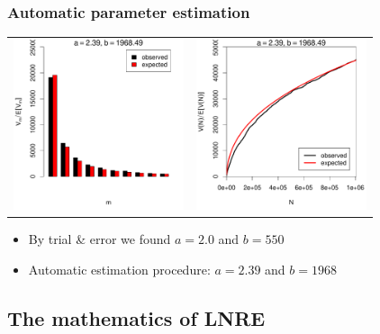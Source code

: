 \documentclass[t]{beamer} %
\begin{document}
\begin{frame}
  \frametitle{Automatic parameter estimation}

  \begin{center}
    \begin{tabular}{c @{} c}
      \includegraphics[width=50mm]{img/05-estimation-spc-estimated} &
      \includegraphics[width=50mm]{img/05-estimation-vgc-estimated} 
    \end{tabular}
  \end{center}

  \ungap[1]
  \begin{itemize}
    \item By trial \& error we found $a=2.0$ and $b=550$
    \item Automatic estimation procedure: $a=2.39$ and $b=1968$
  \end{itemize}
\end{frame}


\subsection{The mathematics of LNRE}
\end{document}
